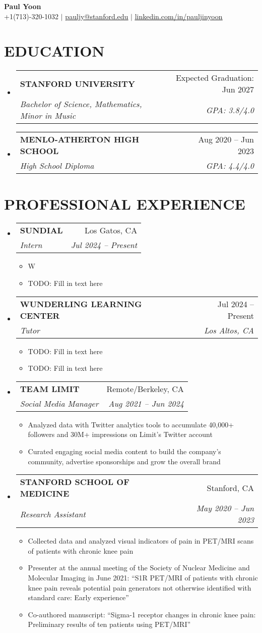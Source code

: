 \documentclass[letterpaper,11pt]{article}
\makeatletter
\newcommand{\resumeItem}[1]{
  \item\small{
    {#1 \vspace{-4pt}}
  }
}
\newcommand{\resumeSubheading}[4]{
  \vspace{-3pt}\item
    \begin{tabular*}{0.97\textwidth}[t]{l@{\extracolsep{\fill}}r}
      \vspace{-2pt}
      \textbf{#1} & \small#2 \\
      \textit{\small#3} & \textit{\small #4} \\
    \end{tabular*}\vspace{-10pt}
}
\newcommand{\resumeSubHeadingListStart}{\begin{itemize}[leftmargin=0in, label={}]}
\newcommand{\resumeSubHeadingListEnd}{\end{itemize}}
\newcommand{\resumeItemListStart}{\begin{itemize}[leftmargin=0.2in]}
\newcommand{\resumeItemListEnd}{\end{itemize}\vspace{-5pt}}
\makeatother
\begin{document}
\begin{center}
    \textbf{\fontsize{17}{17}\selectfont Paul Yoon} \\
      \vspace{1pt}
      \small +1(713)-320-1032 $|$
      \href{mailto:pauljy@stanford.edu}{\underline{pauljy@stanford.edu}} $|$
      \href{https://linkedin.com/in/pauljinyoon{}}{\underline{linkedin.com/in/pauljinyoon}} 
\end{center}


\section{\textbf{EDUCATION}}
  \resumeSubHeadingListStart
    \resumeSubheading
      {STANFORD UNIVERSITY}{Expected Graduation: Jun 2027}
      {Bachelor of Science, Mathematics, Minor in Music}{GPA: 3.8/4.0}
      \vspace{5pt}
    \resumeSubheading
    {MENLO-ATHERTON HIGH SCHOOL}{Aug 2020 -- Jun 2023}
    {High School Diploma}{GPA: 4.4/4.0}
  \resumeSubHeadingListEnd

  \section{\textbf{PROFESSIONAL EXPERIENCE}}
  \resumeSubHeadingListStart

    \resumeSubheading
      {SUNDIAL}{Los Gatos, CA}
      {Intern}{Jul 2024 -- Present}
      \resumeItemListStart
        \resumeItem{W}
        \resumeItem{TODO: Fill in text here}
      \resumeItemListEnd
      
    \resumeSubheading
      {WUNDERLING LEARNING CENTER}{Jul 2024 -- Present}
      {Tutor}{Los Altos, CA}
      \resumeItemListStart
        \resumeItem{TODO: Fill in text here}
        \resumeItem{TODO: Fill in text here}
      \resumeItemListEnd
    
    \resumeSubheading
      {TEAM LIMIT}{Remote/Berkeley, CA}
      {Social Media Manager}{Aug 2021 -- Jun 2024}
      \resumeItemListStart
    \resumeItem{Analyzed data with Twitter analytics tools to accumulate 40,000+ followers and 30M+ impressions on Limit’s Twitter account}
        \resumeItem{Curated engaging social media content to build the company’s community, advertise sponsorships and grow the overall brand}
    \resumeItemListEnd

    \resumeSubheading
      {STANFORD SCHOOL OF MEDICINE}{Stanford, CA}
      {Research Assistant}{May 2020 -- Jun 2023}
      \resumeItemListStart
        \resumeItem{Collected data and analyzed visual indicators of pain in PET/MRI scans of patients with chronic knee pain}
        \resumeItem{Presenter at the annual meeting of the Society of Nuclear Medicine and Molecular Imaging in June 2021: “S1R PET/MRI of
patients with chronic knee pain reveals potential pain generators not otherwise identified with standard care: Early experience”}
\resumeItem{Co-authored manuscript: “Sigma-1 receptor changes in chronic knee pain: Preliminary results of ten patients using PET/MRI”}
      \resumeItemListEnd
      \vspace{-2pt}
  \resumeSubHeadingListEnd
  
\end{document}
